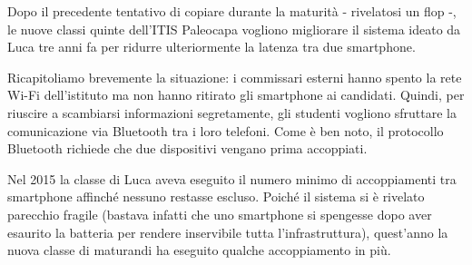 \usepackage{xcolor}
\usepackage{afterpage}
\usepackage{pifont,mdframed}
\usepackage[bottom]{footmisc}
\usepackage{amsthm}
\newtheorem*{lemma}{Lemma}
\newtheorem*{teo}{Teorema}

\newcommand{\inputfile}{\texttt{input.txt}}
\newcommand{\outputfile}{\texttt{output.txt}}

\newenvironment{warning}
  {\par\begin{mdframed}[linewidth=2pt,linecolor=gray]%
    \begin{list}{}{\leftmargin=1cm
                    \labelwidth=\leftmargin}\item[\Large\ding{43}]}
  {\end{list}\end{mdframed}\par}

\newcommand{\funcitem}[2]{\item[$\blacksquare$] \textbf{\large \textsf{Funzione} \texttt{#1}} \vspace{-0.3cm} \begin{center}\begin{tabularx}{\textwidth}{|c|X|} \hline #2 \hline \end{tabularx}\end{center}}


Dopo il precedente tentativo di copiare durante la maturità - rivelatosi un flop -, le nuove classi quinte dell'ITIS Paleocapa vogliono migliorare il sistema ideato da Luca tre anni fa per ridurre ulteriormente la latenza tra due smartphone.

Ricapitoliamo brevemente la situazione: i commissari esterni hanno spento la rete Wi-Fi dell'istituto ma non hanno ritirato gli smartphone ai candidati. Quindi, per riuscire a scambiarsi informazioni segretamente, gli studenti vogliono sfruttare la comunicazione via Bluetooth tra i loro telefoni. Come è ben noto, il protocollo Bluetooth richiede che due dispositivi vengano prima accoppiati.

Nel 2015 la classe di Luca aveva eseguito il numero minimo di accoppiamenti tra smartphone affinché nessuno restasse escluso. Poiché il sistema si è rivelato parecchio fragile (bastava infatti che uno smartphone si spengesse dopo aver esaurito la batteria per rendere inservibile tutta l'infrastruttura), quest'anno la nuova classe di maturandi ha eseguito qualche accoppiamento in più.

